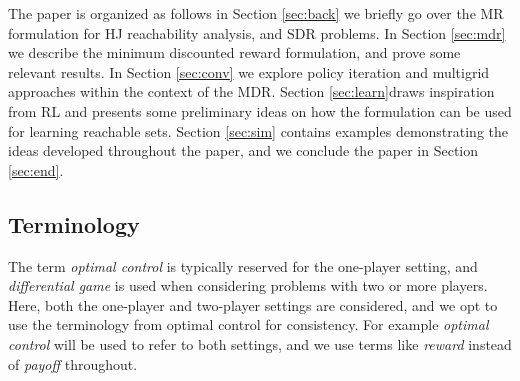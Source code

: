The paper is organized as follows in Section \ref{sec:back} we briefly go over the MR formulation for HJ reachability analysis, and SDR problems. In Section \ref{sec:mdr} we describe the minimum discounted  reward formulation, and prove some relevant results. In Section \ref{sec:conv} we explore policy iteration and multigrid approaches within the context of the MDR. Section \ref{sec:learn}draws inspiration from RL and presents some preliminary ideas on how the formulation can be used for learning reachable sets. Section \ref{sec:sim} contains examples demonstrating the ideas developed throughout the paper, and we conclude the paper in Section \ref{sec:end}.

\subsection*{Terminology}

The term \emph{optimal control} is typically reserved for the one-player setting, and \emph{differential game} is used when considering problems with two or more players. Here, both the one-player and two-player settings are considered, and we opt to use the terminology from optimal control for consistency. For example \emph{optimal control} will be used to refer to both settings, and we use terms like \emph{reward} instead of \emph{payoff} throughout.



